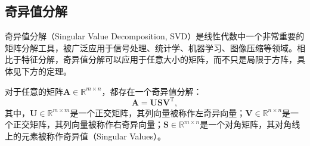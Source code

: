 \subsection{奇异值分解}

奇异值分解（Singular Value Decomposition, SVD）是线性代数中一个非常重要的矩阵分解工具，被广泛应用于信号处理、统计学、机器学习、图像压缩等领域。相比于特征分解，奇异值分解可以应用于任意大小的矩阵，而不只是局限于方阵，具体见下方的定理。

\begin{theorem}
    对于任意的矩阵\( \mathbf{A} \in \mathbb{R}^{m \times n} \)，都存在一个奇异值分解：
    \[
        \mathbf{A} = \mathbf{U} \mathbf{S} \mathbf{V}^{\mathrm{T}},
    \]
    其中，\( \mathbf{U} \in \mathbb{R}^{m \times m} \)是一个正交矩阵，其列向量被称作左奇异向量；\( \mathbf{V} \in \mathbb{R}^{n \times n} \)是一个正交矩阵，其列向量被称作右奇异向量；\( \mathbf{S} \in \mathbb{R}^{m \times n} \)是一个对角矩阵，其对角线上的元素被称作奇异值（Singular Values）。
\end{theorem}

